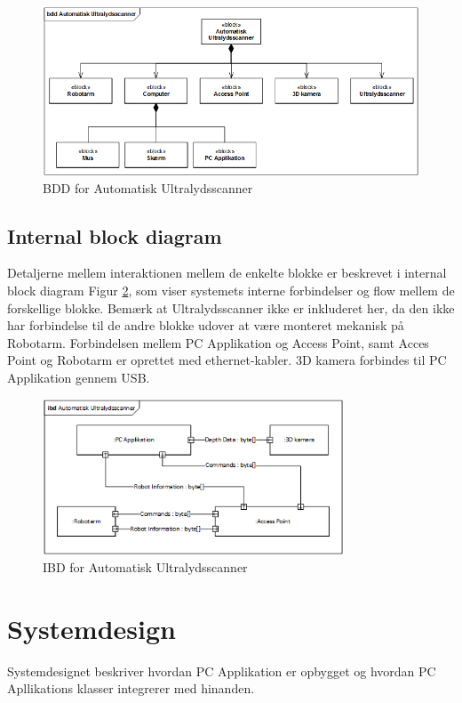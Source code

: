 \begin{figure}[H]
    \centering
    \includegraphics[width=1\textwidth]{figurer/d/Design/BDD}
    \caption{BDD for Automatisk Ultralydsscanner}
    \label{BDD}
\end{figure}

\subsection{Internal block diagram}
Detaljerne mellem interaktionen mellem de enkelte blokke er beskrevet i internal block diagram Figur \ref{IBD}, som viser systemets interne forbindelser og flow mellem de forskellige blokke. Bemærk at Ultralydsscanner ikke er inkluderet her, da den ikke har forbindelse til de andre blokke udover at være monteret mekanisk på Robotarm. Forbindelsen mellem PC Applikation og Access Point, samt Acces Point og Robotarm er oprettet med ethernet-kabler. 3D kamera forbindes til PC Applikation gennem USB.

\begin{figure}[H]
    \centering
    \includegraphics[width=0.8\textwidth]{figurer/d/Design/IBD}
    \caption{IBD for Automatisk Ultralydsscanner}
    \label{IBD}
\end{figure}

\section{Systemdesign} \label{Systemdesign}
Systemdesignet beskriver hvordan PC Applikation er opbygget og hvordan PC Apllikations klasser integrerer med hinanden.  

